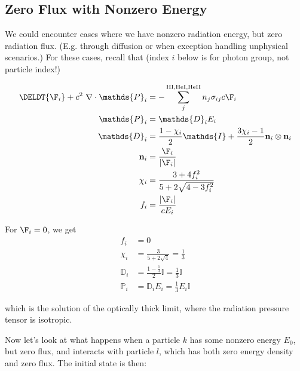\subsection{Zero Flux with Nonzero Energy} \label{chap:zero-flux-nonzer-energy}

We could encounter cases where we have nonzero radiation energy, but zero
radiation flux. (E.g. through diffusion or when exception handling unphysical
scenarios.) For these cases, recall that (index $i$ below is for photon group,
not particle index!)

\begin{align}
	\DELDT{\F_i} + c^2 \ \nabla \cdot \mathds{P}_i &=
		- \sum\limits_{j}^{\mathrm{HI, HeI, HeII}} n_j \sigma_{i j} c \F_i \\
	\mathds{P}_i &=
		\mathds{D}_i E_i \\
	\mathds{D}_i &=
		\frac{1- \chi_i}{2} \mathds{I} + \frac{3 \chi_i - 1}{2} \mathbf{n}_i \otimes \mathbf{n}_i\\
	\mathbf{n}_i &=
		\frac{\F_i}{|\F_i|} \\
	\chi_i &=
		\frac{3 + 4 f_i ^2}{5 + 2 \sqrt{4 - 3 f_i^2}} \\
	f_i &=
		\frac{|\F_i|}{c E_i}
\end{align}

For $\F_i = 0$, we get
\begin{align}
	f_i &= 0 \\
	\chi_i &= \frac{3}{5 + 2 \sqrt{4}} = \frac{1}{3} \\
	\mathds{D}_i &= \frac{1- \frac{1}{3}}{2} \mathds{I} = \frac{1}{3} \mathds{I} \\
	\mathds{P}_i &= \mathds{D}_i E_i =  \frac{1}{3} E_i \mathds{I}
\end{align}

which is the solution of the optically thick limit, where the radiation pressure tensor is 
isotropic.


Now let's look at what happens when a particle $k$ has some nonzero energy $E_0$, but zero flux, 
and interacts with particle $l$, which has both zero energy density and zero flux. The initial 
state is then:

